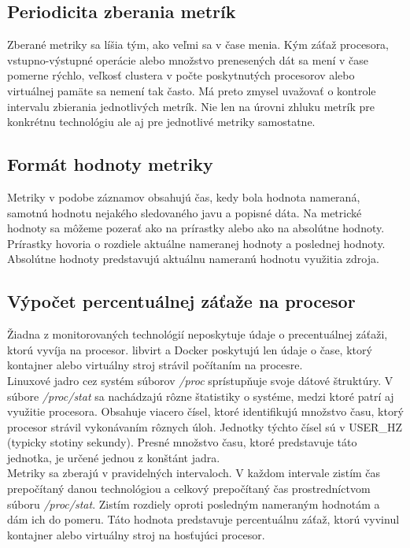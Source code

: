 \documentclass[12pt,twoside,color,cover,table]{fithesis3}
\begin{document}
\subsection{Periodicita zberania metrík}
Zberané metriky sa líšia tým, ako veľmi sa v čase menia. Kým záťaž procesora, vstupno-výstupné operácie alebo množstvo prenesených dát sa mení v čase pomerne rýchlo, veľkosť clustera v počte poskytnutých procesorov 
alebo virtuálnej pamäte sa nemení tak často. Má preto zmysel uvažovať o kontrole intervalu zbierania jednotlivých metrík. Nie len na úrovni zhluku metrík pre konkrétnu technológiu ale aj pre jednotlivé metriky samostatne.

\subsection{Formát hodnoty metriky}
Metriky v podobe záznamov obsahujú čas, kedy bola hodnota nameraná, samotnú hodnotu nejakého sledovaného javu a popisné dáta. Na metrické
hodnoty sa môžeme pozerať ako na prírastky alebo ako na absolútne hodnoty. Prírastky hovoria o rozdiele aktuálne nameranej hodnoty 
a poslednej hodnoty. Absolútne hodnoty predstavujú aktuálnu nameranú hodnotu využitia zdroja. 

\subsection{Výpočet percentuálnej záťaže na procesor}
Žiadna z monitorovaných technológií neposkytuje údaje o precentuálnej záťaži, ktorú vyvíja na procesor. libvirt a Docker poskytujú len údaje o čase, ktorý kontajner alebo virtuálny stroj strávil
počítaním na procesre. 
\\Linuxové jadro cez systém súborov \textit{/proc} sprístupňuje svoje dátové štruktúry. V súbore \textit{/proc/stat} sa nachádzajú rôzne štatistiky o systéme, medzi ktoré patrí aj 
využitie procesora. Obsahuje viacero čísel, ktoré identifikujú množstvo času, ktorý procesor strávil vykonávaním rôznych úloh. Jednotky týchto čísel sú v USER\_HZ (typicky stotiny sekundy).%
Presné množstvo času, ktoré predstavuje táto jednotka, je určené jednou z konštánt jadra.
\\Metriky sa zberajú v pravidelných intervaloch. V každom intervale zistím čas prepočítaný danou technológiou a celkový prepočítaný čas prostredníctvom súboru \textit{/proc/stat}. Zistím rozdiely oproti posledným nameraným hodnotám a dám ich do pomeru.
Táto hodnota predstavuje percentuálnu záťaž, ktorú vyvinul kontajner alebo virtuálny stroj na hosťujúci procesor.
\end{document}
